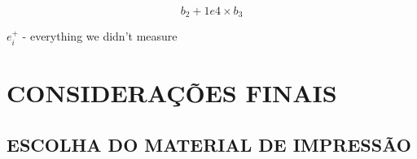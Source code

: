 \documentclass[12pt,]{04-class-files/abntex2}
\begin{document}
\[b_2 + 1e4 \times b_3\]

\(e^+_i\) - everything we didn't measure


\chapter*[Conclusão]{CONSIDERAÇÕES FINAIS}

\lipsum[31-33]

\postextual


\printbibliography

\postextual


{\begin{apendicesenv}

\renewcommand{\thechapter}{\arabic{chapter}}

\chapter{ESCOLHA DO MATERIAL DE IMPRESSÃO}

\lipsum[30]

\end{apendicesenv}
}{}



\printbibliography
\end{document}
